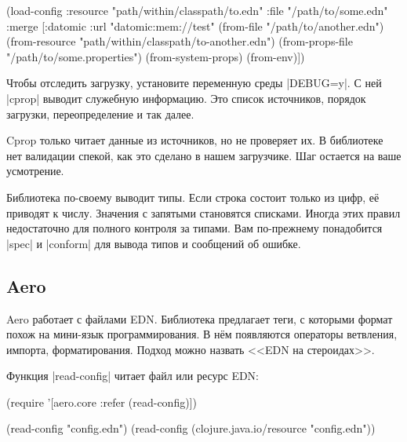 \begin{english}
  \begin{clojure}
(load-config
 :resource "path/within/classpath/to.edn"
 :file "/path/to/some.edn"
 :merge [{:datomic {:url "datomic:mem://test"}}
         (from-file "/path/to/another.edn")
         (from-resource "path/within/classpath/to-another.edn")
         (from-props-file "/path/to/some.properties")
         (from-system-props)
         (from-env)])
  \end{clojure}
\end{english}

Чтобы отследить загрузку, установите переменную среды \spverb|DEBUG=y|. С ней
\spverb|cprop| выводит служебную информацию. Это список источников, порядок
загрузки, переопределение и так далее.

Cprop только читает данные из источников, но не проверяет их. В библиотеке нет
валидации спекой, как это сделано в нашем загрузчике. Шаг остается на ваше
усмотрение.

Библиотека по-своему выводит типы. Если строка состоит только из цифр, е\"{е}
приводят к числу. Значения с запятыми становятся списками. Иногда этих правил
недостаточно для полного контроля за типами. Вам по-прежнему понадобится
\spverb|spec| и \spverb|conform| для вывода типов и сообщений об ошибке.

\subsection{Aero}


Aero работает с файлами EDN. Библиотека
предлагает теги, с которыми формат похож на мини-язык программирования. В н\"{е}м
появляются операторы ветвления, импорта, форматирования. Подход можно назвать
<<EDN на стероидах>>.


Функция \spverb|read-config| читает файл или ресурс EDN:

\begin{english}
  \begin{clojure}
(require '[aero.core :refer (read-config)])

(read-config "config.edn")
(read-config (clojure.java.io/resource "config.edn"))
  \end{clojure}
\end{english}



